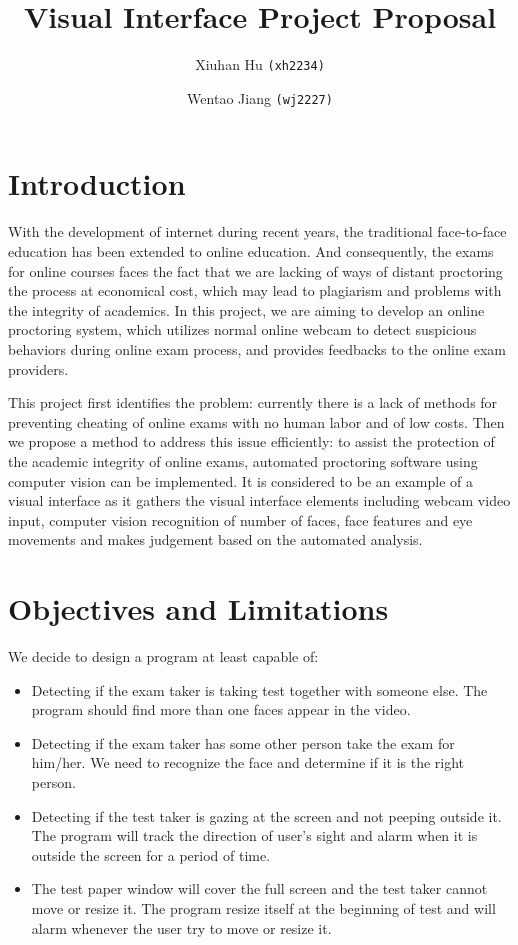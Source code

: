 \documentclass[11pt,letterpaper]{article}
\begin{document}
\title {Visual Interface Project Proposal}
\author {
	Xiuhan Hu \texttt{(xh2234)} \and     
	Wentao Jiang \texttt{(wj2227)}
}
\maketitle


\section{Introduction}
With the development of internet during recent years, the traditional face-to-face education has been extended to online education. And consequently, the exams for online courses faces the fact that we are lacking of ways of distant proctoring the process at economical cost, which may lead to plagiarism and problems with the integrity of academics\cite{c1}. In this project, we are aiming to develop an online proctoring system\cite{c2}, which utilizes normal online webcam to detect suspicious behaviors during online exam process, and provides feedbacks to the online exam providers. 

This project first identifies the problem: currently there is a lack of methods for preventing cheating of online exams with no human labor and of low costs. Then we propose a method to address this issue efficiently: to assist the protection of the academic integrity of online exams, automated proctoring software using computer vision can be implemented. It is considered to be an example of a visual interface as it gathers the visual interface elements including webcam video input, computer vision recognition of number of faces, face features and eye movements and makes judgement based on the automated analysis.


\section{Objectives and Limitations}

We decide to design a program at least capable of:
\begin{itemize}
\item Detecting if the exam taker is taking test together with someone else. The program should find more than one faces appear in the video.
\item Detecting if the exam taker has some other person take the exam for him/her. We need to recognize the face and determine if it is the right person.
\item Detecting if the test taker is gazing at the screen and not peeping outside it. The program will track the direction of user’s sight and alarm when it is outside the screen for a period of time.
\item The test paper window will cover the full screen and the test taker cannot move or resize it. The program resize itself at the beginning of test and will alarm whenever the user try to move or resize it.
\end{itemize}
\end{document}
